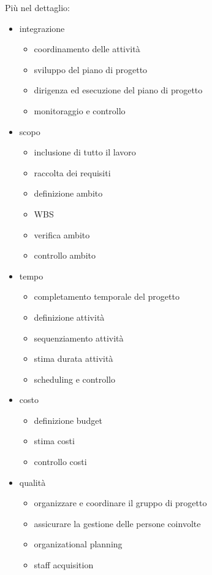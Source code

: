 \documentclass[answers, a4paper, 11pt]{exam}
\begin{document}
Più nel dettaglio:
\begin{itemize}
    \item integrazione
    \begin{itemize}
        \item coordinamento delle attività
        \item sviluppo del piano di progetto
        \item dirigenza ed esecuzione del piano di progetto
        \item monitoraggio e controllo
    \end{itemize}
    \item scopo
    \begin{itemize}
        \item inclusione di tutto il lavoro
        \item raccolta dei requisiti
        \item definizione ambito
        \item WBS
        \item verifica ambito
        \item controllo ambito
    \end{itemize}
    \item tempo
    \begin{itemize}
        \item completamento temporale del progetto
        \item definizione attività
        \item sequenziamento attività
        \item stima durata attività
        \item scheduling e controllo
    \end{itemize}
    \item costo
    \begin{itemize}
        \item definizione budget
        \item stima costi
        \item controllo costi
    \end{itemize}
    \item qualità
    \begin{itemize}
        \item organizzare e coordinare il gruppo di progetto
        \item assicurare la gestione delle persone coinvolte
        \item organizational planning
        \item staff acquisition

\end{itemize}
\end{itemize}
\end{document}
